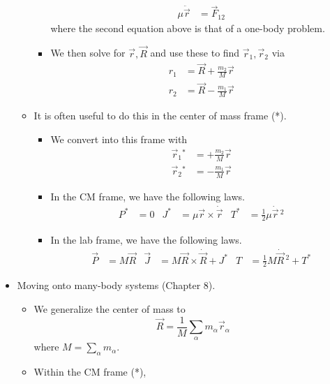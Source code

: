 \documentclass[../notes.tex]{subfiles}
\begin{document}
\begin{itemize}
\begin{itemize}
\begin{itemize}
\begin{align*}
                \mu\ddot{\vec{r}} &= \vec{F}_{12}
            \end{align*}
            where the second equation above is that of a one-body problem.
            \item We then solve for $\vec{r},\vec{R}$ and use these to find $\vec{r}_1,\vec{r}_2$ via
            \begin{align*}
                r_1 &= \vec{R}+\frac{m_2}{M}\vec{r}\\
                r_2 &= \vec{R}-\frac{m_1}{M}\vec{r}
            \end{align*}
        \end{itemize}
        \item It is often useful to do this in the center of mass frame (*).
        \begin{itemize}
            \item We convert into this frame with
            \begin{align*}
                \vec{r}_1{}^* &= +\frac{m_2}{M}\vec{r}\\
                \vec{r}_2{}^* &= -\frac{m_1}{M}\vec{r}
            \end{align*}
            \item In the CM frame, we have the following laws.
            \begin{align*}
                P^* &= 0&
                J^* &= \mu\vec{r}\times\dot{\vec{r}}&
                T^* &= \frac{1}{2}\mu\dot{\vec{r}}{\,}^2
            \end{align*}
            \item In the lab frame, we have the following laws.
            \begin{align*}
                \vec{P} &= M\vec{R}&
                \vec{J} &= M\vec{R}\times\dot{\vec{R}}+J^*&
                T &= \frac{1}{2}M\dot{\vec{R}}{\,}^2+T^*
            \end{align*}
        \end{itemize}
    \end{itemize}
    \item Moving onto many-body systems (Chapter 8).
    \begin{itemize}
        \item We generalize the center of mass to
        \begin{equation*}
            \vec{R} = \frac{1}{M}\sum_\alpha m_\alpha\vec{r}_\alpha
        \end{equation*}
        where $M=\sum_\alpha m_\alpha$.
        \item Within the CM frame (*),

\end{itemize}
\end{itemize}
\end{document}
